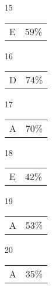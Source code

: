 \documentclass[12pt]{article}
\begin{document}
\begin{multicols}{5}
\begin{enumerate}
\item[15] \begin{tabular}{cc} E & 59\%\end{tabular}
\item[]
\item[16] \begin{tabular}{cc} D & 74\%\end{tabular}
\item[17] \begin{tabular}{cc} A & 70\%\end{tabular}
\item[18] \begin{tabular}{cc} E & 42\%\end{tabular}
\item[19] \begin{tabular}{cc} A & 53\%\end{tabular}
\item[20] \begin{tabular}{cc} A & 35\%\end{tabular}

\item[]


\end{enumerate}
\end{multicols}
\end{document}
